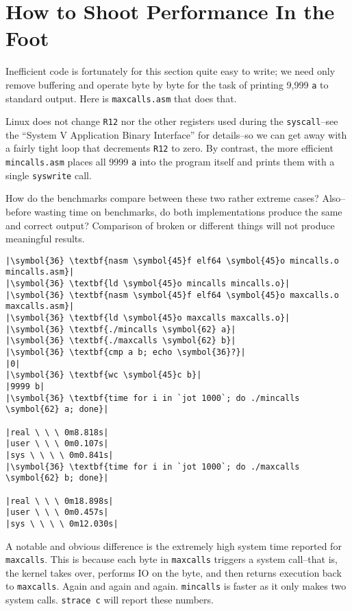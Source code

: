 \documentclass[10pt,a4paper]{article}
\begin{document}
\section*{How to Shoot Performance In the Foot}

Inefficient code is fortunately for this section quite easy to write; we
need only remove buffering and operate byte by byte for the task of
printing 9,999 \texttt{a} to standard output. Here is
\texttt{maxcalls.asm} that does that.



Linux does not change \texttt{R12} nor the other registers used during
the \texttt{syscall}--see the ``System V Application Binary Interface''
for details--so we can get away with a fairly tight loop that decrements
\texttt{R12} to zero. By contrast, the more efficient
\texttt{mincalls.asm} places all 9999 \texttt{a} into the program itself
and prints them with a single \texttt{syswrite} call.



How do the benchmarks compare between these two rather extreme cases?
Also--before wasting time on benchmarks, do both implementations produce
the same and correct output? Comparison of broken or different things
will not produce meaningful results.

\begin{lstlisting}
|\symbol{36} \textbf{nasm \symbol{45}f elf64 \symbol{45}o mincalls.o mincalls.asm}|
|\symbol{36} \textbf{ld \symbol{45}o mincalls mincalls.o}|
|\symbol{36} \textbf{nasm \symbol{45}f elf64 \symbol{45}o maxcalls.o maxcalls.asm}|
|\symbol{36} \textbf{ld \symbol{45}o maxcalls maxcalls.o}|
|\symbol{36} \textbf{./mincalls \symbol{62} a}|
|\symbol{36} \textbf{./maxcalls \symbol{62} b}|
|\symbol{36} \textbf{cmp a b; echo \symbol{36}?}|
|0|
|\symbol{36} \textbf{wc \symbol{45}c b}|
|9999 b|
|\symbol{36} \textbf{time for i in `jot 1000`; do ./mincalls \symbol{62} a; done}|

|real \ \ \ 0m8.818s|
|user \ \ \ 0m0.107s|
|sys \ \ \ \ 0m0.841s|
|\symbol{36} \textbf{time for i in `jot 1000`; do ./maxcalls \symbol{62} b; done}|

|real \ \ \ 0m18.898s|
|user \ \ \ 0m0.457s|
|sys \ \ \ \ 0m12.030s|
\end{lstlisting}

A notable and obvious difference is the extremely high system time
reported for \texttt{maxcalls}. This is because each byte in
\texttt{maxcalls} triggers a system call--that is, the kernel takes
over, performs IO on the byte, and then returns execution back to
\texttt{maxcalls}. Again and again and again. \texttt{mincalls} is
faster as it only makes two system calls. \texttt{strace c}
will report these numbers.
\end{document}
